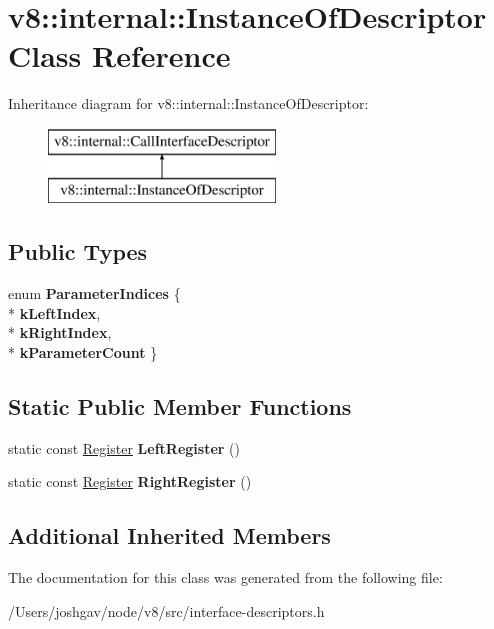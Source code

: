 \hypertarget{classv8_1_1internal_1_1_instance_of_descriptor}{}\section{v8\+:\+:internal\+:\+:Instance\+Of\+Descriptor Class Reference}
\label{classv8_1_1internal_1_1_instance_of_descriptor}
Inheritance diagram for v8\+:\+:internal\+:\+:Instance\+Of\+Descriptor\+:\begin{figure}[H]
\begin{center}
\leavevmode
\includegraphics[height=2.000000cm]{classv8_1_1internal_1_1_instance_of_descriptor}
\end{center}
\end{figure}
\subsection*{Public Types}
\begin{DoxyCompactItemize}
\item 
enum {\bfseries Parameter\+Indices} \{ \\*
{\bfseries k\+Left\+Index}, 
\\*
{\bfseries k\+Right\+Index}, 
\\*
{\bfseries k\+Parameter\+Count}
 \}\hypertarget{classv8_1_1internal_1_1_instance_of_descriptor_ae266437578d736ff960ca6822c261e69}{}\label{classv8_1_1internal_1_1_instance_of_descriptor_ae266437578d736ff960ca6822c261e69}

\end{DoxyCompactItemize}
\subsection*{Static Public Member Functions}
\begin{DoxyCompactItemize}
\item 
static const \hyperlink{structv8_1_1internal_1_1_register}{Register} {\bfseries Left\+Register} ()\hypertarget{classv8_1_1internal_1_1_instance_of_descriptor_accd6ef9cfb5b9f5d76d0c9acbe1a9357}{}\label{classv8_1_1internal_1_1_instance_of_descriptor_accd6ef9cfb5b9f5d76d0c9acbe1a9357}

\item 
static const \hyperlink{structv8_1_1internal_1_1_register}{Register} {\bfseries Right\+Register} ()\hypertarget{classv8_1_1internal_1_1_instance_of_descriptor_a2cd3e04f3a4fa48598dafedc7f4218ba}{}\label{classv8_1_1internal_1_1_instance_of_descriptor_a2cd3e04f3a4fa48598dafedc7f4218ba}

\end{DoxyCompactItemize}
\subsection*{Additional Inherited Members}


The documentation for this class was generated from the following file\+:\begin{DoxyCompactItemize}
\item 
/\+Users/joshgav/node/v8/src/interface-\/descriptors.\+h\end{DoxyCompactItemize}
